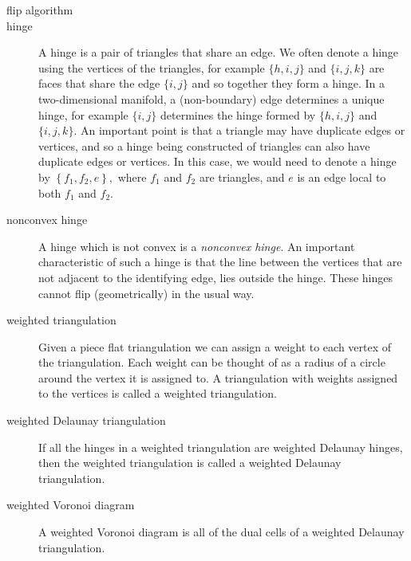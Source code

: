 \documentclass{article}%
\begin{document}
\begin{description}
\item[flip algorithm] 

\item[hinge]  A hinge is a pair of triangles that share an edge. We often
denote a hinge using the vertices of the triangles, for example $\{h,i,j\}$
and $\{i,j,k\}$ are faces that share the edge $\{i,j\}$ and so together they
form a hinge. In a two-dimensional manifold, a (non-boundary) edge determines
a unique hinge, for example $\{i,j\}$ determines the hinge formed by
$\{h,i,j\}$ and $\{i,j,k\}$. An important point is that a triangle may have
duplicate edges or vertices, and so a hinge being constructed of triangles can
also have duplicate edges or vertices. In this case, we would need to denote a
hinge by $\left\{  f_{1},f_{2},e\right\}  ,$ where $f_{1}$ and $f_{2}$ are
triangles, and $e$ is an edge local to both $f_{1}$ and $f_{2}.$

\item[nonconvex hinge]  A hinge which is not convex is a \emph{nonconvex
hinge}. An important characteristic of such a hinge is that the line between
the vertices that are not adjacent to the identifying edge, lies outside the
hinge. These hinges cannot flip (geometrically) in the usual way.

\item[weighted triangulation]  Given a piece flat triangulation we can assign
a weight to each vertex of the triangulation. Each weight can be thought of as
a radius of a circle around the vertex it is assigned to. A triangulation with
weights assigned to the vertices is called a weighted triangulation. 

\item[weighted Delaunay triangulation]  If all the hinges in a weighted
triangulation are weighted Delaunay hinges, then the weighted triangulation is
called a weighted Delaunay triangulation.

\item[weighted Voronoi diagram]  A weighted Voronoi diagram is all of the dual
cells of a weighted Delaunay triangulation.
\end{description}
\end{document}
